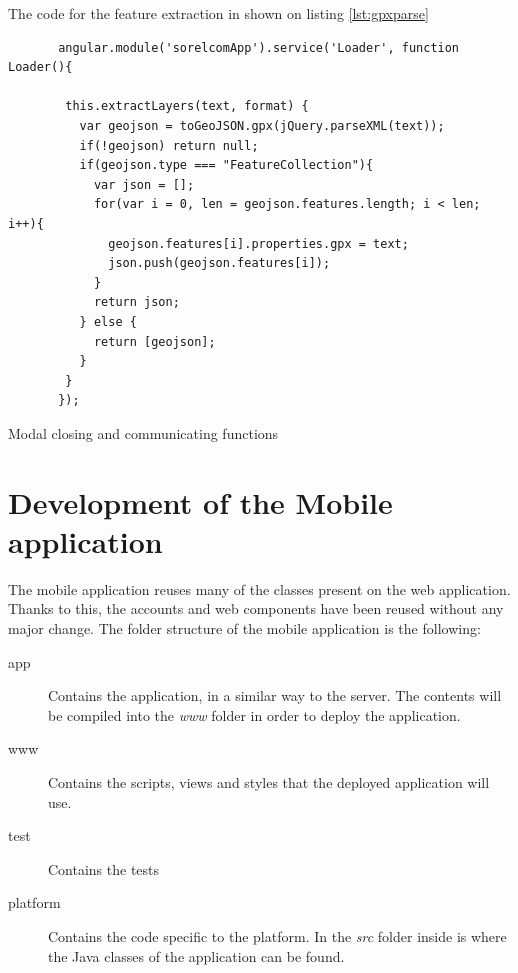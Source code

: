 The code for the feature extraction in shown on listing \ref{lst:gpxparse}

\begin{listing}[ht]\centering
  \begin{minipage}{.8\textwidth}
    \begin{verbatim}
       angular.module('sorelcomApp').service('Loader', function Loader(){
       
        this.extractLayers(text, format) {
          var geojson = toGeoJSON.gpx(jQuery.parseXML(text));
          if(!geojson) return null;
          if(geojson.type === "FeatureCollection"){
            var json = [];
            for(var i = 0, len = geojson.features.length; i < len; i++){
              geojson.features[i].properties.gpx = text;
              json.push(geojson.features[i]);
            }
            return json;
          } else {
            return [geojson];
          }
        }
       });
    \end{verbatim}
  \end{minipage}
  \caption{Modal closing and communicating functions}\label{lst:gpxparse}
\end{listing}

\section{Development of the Mobile application}

The mobile application reuses many of the classes present on the web application. Thanks to this, the accounts and web components have been reused without any major change. The folder structure of the mobile application is the following:

\begin{description}
\item[app] Contains the application, in a similar way to the server. The contents will be compiled into the \textit{www} folder in order to deploy the application.

\item[www] Contains the scripts, views and styles that the deployed application will use.

\item[test] Contains the tests

\item[platform] Contains the code specific to the platform. In the \textit{src} folder inside is where the Java classes of the application can be found.
\end{description}

